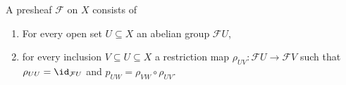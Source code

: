 A presheaf $\mathcal{F}$ on $X$ consists of
\begin{enumerate}
	\item For every open set $U \subseteq X$ an abelian group $\mathcal{F}U$,
	\item for every inclusion $V \subseteq U \subseteq X$ a restriction map
		$\rho_{UV}\colon \mathcal{F}U \to \mathcal{F}V$ such that $\rho_{UU} = \id_{\mathcal{F}U}$ and
		$p_{UW} = \rho_{VW} \circ \rho_{UV}$.
\end{enumerate}
